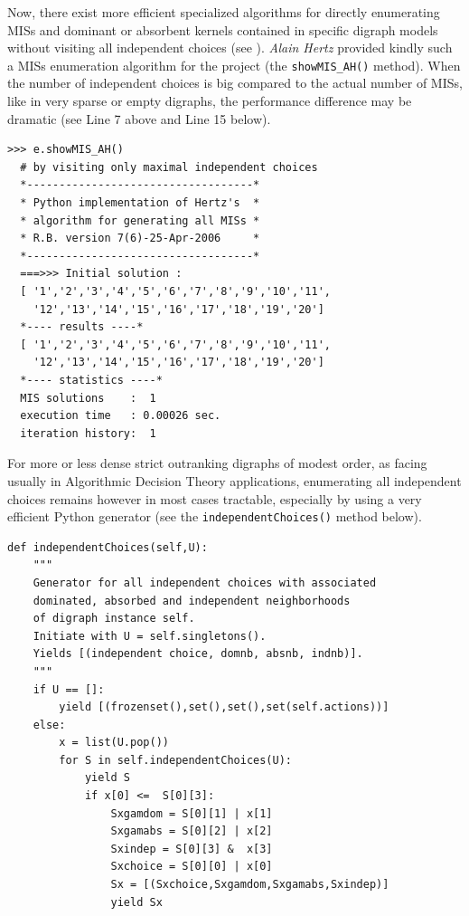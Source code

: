 Now, there exist more efficient specialized algorithms for directly enumerating MISs and dominant or absorbent kernels contained in specific digraph models without visiting all independent choices (see \citep{BIS-2006b}). \emph{Alain Hertz} provided kindly such a MISs enumeration algorithm for the \Digraph project (the \texttt{showMIS\_AH()} method). When the number of independent choices is big compared to the actual number of MISs, like in very sparse or empty digraphs, the performance difference may be dramatic (see Line 7 above and Line 15 below).
\begin{lstlisting}
>>> e.showMIS_AH()
  # by visiting only maximal independent choices
  *-----------------------------------*
  * Python implementation of Hertz's  *
  * algorithm for generating all MISs *
  * R.B. version 7(6)-25-Apr-2006     *
  *-----------------------------------*
  ===>>> Initial solution :
  [ '1','2','3','4','5','6','7','8','9','10','11',
    '12','13','14','15','16','17','18','19','20']
  *---- results ----*
  [ '1','2','3','4','5','6','7','8','9','10','11',
    '12','13','14','15','16','17','18','19','20']
  *---- statistics ----*
  MIS solutions    :  1
  execution time   : 0.00026 sec.
  iteration history:  1
\end{lstlisting}

For more or less dense strict outranking digraphs of modest order, as facing usually in Algorithmic Decision Theory applications, enumerating all independent choices remains however in most cases tractable, especially by using a very efficient Python generator (see the \texttt{independentChoices()} method below).
\begin{lstlisting}
def independentChoices(self,U):
    """
    Generator for all independent choices with associated
    dominated, absorbed and independent neighborhoods
    of digraph instance self.
    Initiate with U = self.singletons().
    Yields [(independent choice, domnb, absnb, indnb)].
    """
    if U == []:
        yield [(frozenset(),set(),set(),set(self.actions))]
    else:
        x = list(U.pop())
        for S in self.independentChoices(U):
            yield S
            if x[0] <=  S[0][3]:
                Sxgamdom = S[0][1] | x[1]
                Sxgamabs = S[0][2] | x[2]
                Sxindep = S[0][3] &  x[3]
                Sxchoice = S[0][0] | x[0]
                Sx = [(Sxchoice,Sxgamdom,Sxgamabs,Sxindep)]
                yield Sx
\end{lstlisting}

